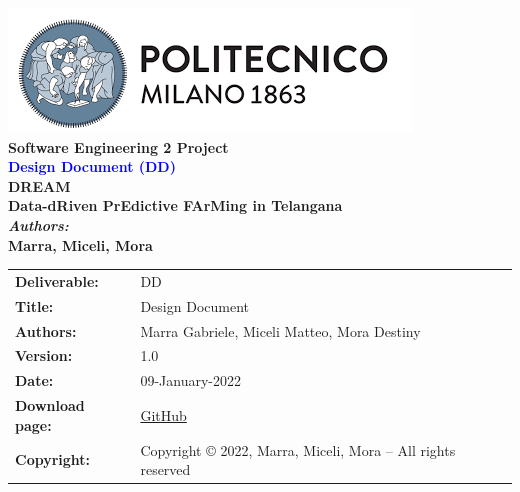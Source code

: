 
\usepackage{longtable} 
\usepackage{multicol}




\setcounter{figure_counter}{1}

\setcounter{table_counter}{1}



\begin{titlepage}

\centering
{\includegraphics[scale=0.7]{Images/PolimiLogo}}\\[4cm]

{\textbf{\Large{Software Engineering 2 Project}}}\\ [4cm]




\centering
{\textcolor{Blue}{\textbf{\Huge{Design Document (DD)}}}} \\ [4cm]

{\textbf{{\huge{DREAM}}\\[2mm]\large{Data-dRiven PrEdictive FArMing in Telangana}}}\\ [4cm]

{\textbf{\large{\textit{Authors:}}\\[1mm]\Large{Marra, Miceli, Mora}}}\\ [3cm]

\end{titlepage}

\begin{table}[h!]
\begin{tabu} to \textwidth { X[0.3,r,p] X[0.7,l,p] }
\hline

\textbf{Deliverable:} & DD\\
\textbf{Title:} & Design Document \\
\textbf{Authors:} & Marra Gabriele, Miceli Matteo, Mora Destiny \\
\textbf{Version:} & 1.0 \\ 
\textbf{Date:} & 09-January-2022 \\
\textbf{Download page:} & \href{https://github.com/gabrielemarra/MarraMiceliMora}{GitHub} \\
\textbf{Copyright:} & Copyright © 2022, Marra, Miceli, Mora – All rights reserved \\
\hline
\end{tabu}
\end{table}




